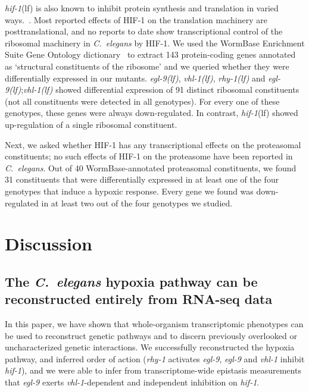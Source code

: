 \documentclass[9pt,twocolumn,twoside]{pnas-new}
\newcommand{\cel}{\emph{C.~elegans}}
\newcommand{\gene}[1]{\emph{#1}}
\newcommand{\egl}{\emph{\mbox{egl-9}(lf)}}
\newcommand{\rhy}{\emph{\mbox{rhy-1}(lf)}}
\newcommand{\vhl}{\emph{\mbox{vhl-1}(lf)}}
\newcommand{\hif}{\emph{\mbox{hif-1}}(lf)}
\newcommand{\hifp}{HIF-1}
\begin{document}

\hif{} is also known to inhibit protein synthesis and translation in varied
ways.~\cite{Brugarolas2004}. Most reported effects of
\hifp{} on the translation machinery are posttranslational, and no reports to date
show transcriptional control of the ribosomal machinery in \cel{} by \hifp{}. We
used the WormBase Enrichment Suite Gene Ontology
dictionary~\cite{Angeles-Albores2016b} to extract 143 protein-coding genes
annotated as `structural constituents of the ribosome' and we queried whether
they were differentially expressed in our mutants. \egl{}, \vhl{}, \rhy{} and
\egl{};\vhl{} showed differential expression of 91 distinct ribosomal constituents
(not all constituents were detected in all genotypes). For every one of these
genotypes, these genes were always down-regulated. In contrast, \hif{} showed
up-regulation of a single ribosomal constituent.

Next, we asked whether \hifp{} has any transcriptional effects on the
proteasomal constituents; no such effects of \hifp{} on the proteasome
have been reported in \cel{}. Out of 40 WormBase-annotated proteasomal constituents,
we found 31 constituents that were differentially expressed in at least one of the
four genotypes that induce a hypoxic response. Every gene we found was down-regulated
in at least two out of the four genotypes we studied.

\section*{Discussion}
\subsection*{The \cel{} hypoxia pathway can be reconstructed entirely from
             RNA-seq data}
In this paper, we have shown that whole-organism transcriptomic phenotypes
can be used to reconstruct genetic pathways and to discern previously overlooked
or uncharacterized genetic interactions. We successfully reconstructed the hypoxia
pathway, and inferred order of action (\gene{rhy-1} activates \gene{egl-9},
\gene{egl-9} and \gene{vhl-1} inhibit \gene{hif-1}), and we were able to infer
from transcriptome-wide epistasis measurements that \gene{egl-9} exerts
\gene{vhl-1}-dependent and independent inhibition on \gene{hif-1}.
\end{document}
